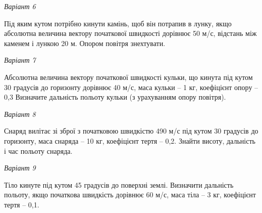 \vspace{1em}
\textit{Варіант 6}\par
Під яким кутом потрібно кинути камінь, щоб він потрапив в лунку, якщо абсолютна величина вектору початкової швидкості дорівнює 50 м/с, відстань між каменем і лункою 20 м. Опором повітря знехтувати.

\vspace{1em}
\textit{Варіант 7}\par
Абсолютна величина вектору початкової швидкості кульки, що кинута під кутом 30 градусів до горизонту дорівнює 40 м/с, маса кульки – 1 кг, коефіцієнт опору – 0,3 Визначите дальність польоту кульки (з урахуванням опору повітря).

\vspace{1em}
\textit{Варіант 8}\par
Снаряд вилітає зі зброї з початковою швидкістю 490 м/с під кутом 30 градусів до горизонту, маса снаряда – 10 кг, коефіцієнт тертя – 0,2. Знайти висоту, дальність і час польоту снаряда.

\vspace{1em}
\textit{Варіант 9}\par
Тіло кинуте під кутом 45 градусів до поверхні землі. Визначити дальність польоту, якщо початкова швидкість дорівнює 60 м/с, маса тіла – 3 кг, коефіцієнт тертя – 0,1.
